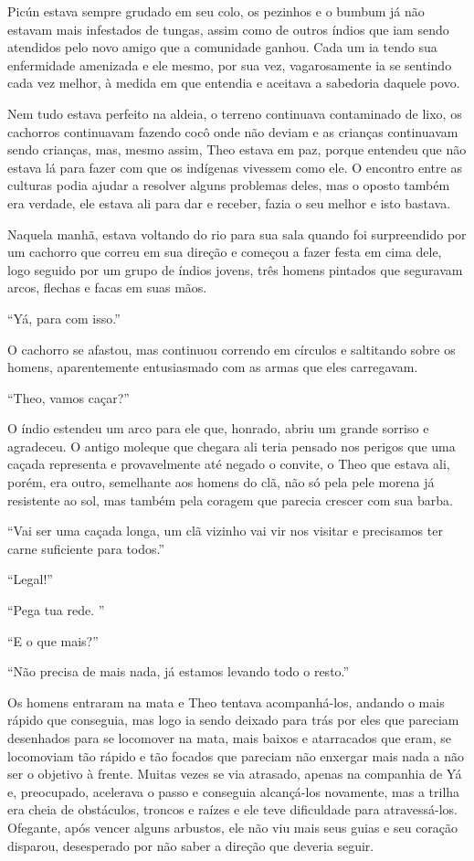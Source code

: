 Picún estava sempre grudado em seu colo, os pezinhos e o bumbum já não
estavam mais infestados de tungas, assim como de outros índios que iam
sendo atendidos pelo novo amigo que a comunidade ganhou. Cada um ia
tendo sua enfermidade amenizada e ele mesmo, por sua vez, vagarosamente
ia se sentindo cada vez melhor, à medida em que entendia e aceitava a
sabedoria daquele povo.

Nem tudo estava perfeito na aldeia, o terreno continuava contaminado de
lixo, os cachorros continuavam fazendo cocô onde não deviam e as
crianças continuavam sendo crianças, mas, mesmo assim, Theo estava em
paz, porque entendeu que não estava lá para fazer com que os indígenas
vivessem como ele. O encontro entre as culturas podia ajudar a resolver
alguns problemas deles, mas o oposto também era verdade, ele estava ali
para dar e receber, fazia o seu melhor e isto bastava.

Naquela manhã, estava voltando do rio para sua sala quando foi
surpreendido por um cachorro que correu em sua direção e começou a fazer
festa em cima dele, logo seguido por um grupo de índios jovens, três
homens pintados que seguravam arcos, flechas e facas em suas mãos.

``Yá, para com isso.''

O cachorro se afastou, mas continuou correndo em círculos e saltitando
sobre os homens, aparentemente entusiasmado com as armas que eles
carregavam.

``Theo, vamos caçar?''

O índio estendeu um arco para ele que, honrado, abriu um grande sorriso
e agradeceu. O antigo moleque que chegara ali teria pensado nos perigos
que uma caçada representa e provavelmente até negado o convite, o Theo
que estava ali, porém, era outro, semelhante aos homens do clã, não só
pela pele morena já resistente ao sol, mas também pela coragem que
parecia crescer com sua barba.

``Vai ser uma caçada longa, um clã vizinho vai vir nos visitar e
precisamos ter carne suficiente para todos.''

``Legal!''

``Pega tua rede. ''

``E o que mais?''

``Não precisa de mais nada, já estamos levando todo o resto.''

Os homens entraram na mata e Theo tentava acompanhá-los, andando o mais
rápido que conseguia, mas logo ia sendo deixado para trás por eles que
pareciam desenhados para se locomover na mata, mais baixos e atarracados
que eram, se locomoviam tão rápido e tão focados que pareciam não
enxergar mais nada a não ser o objetivo à frente. Muitas vezes se via
atrasado, apenas na companhia de Yá e, preocupado, acelerava o passo e
conseguia alcançá-los novamente, mas a trilha era cheia de obstáculos,
troncos e raízes e ele teve dificuldade para atravessá-los. Ofegante,
após vencer alguns arbustos, ele não viu mais seus guias e seu coração
disparou, desesperado por não saber a direção que deveria seguir.

